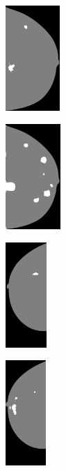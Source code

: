 \documentclass{beamer}
\begin{document}
\begin{frame}
		\begin{figure}[h]
		\centering
			\begin{subfigure}{0.24\textwidth}
				\centering
					\includegraphics[height=4cm]{plots/label_ex1.png}
			\end{subfigure}
			\begin{subfigure}{0.24\textwidth}
				\centering
					\includegraphics[height=4cm]{plots/segmentation_ex1_v3_zeropointone.png}
			\end{subfigure}
			\begin{subfigure}{0.24\textwidth}
				\centering
					\includegraphics[height=4cm]{plots/label_ex2.png}
			\end{subfigure}
			\begin{subfigure}{0.24\textwidth}
				\centering
					\includegraphics[height=4cm]{plots/segmentation_ex2_v3_zeropointone.png}
			\end{subfigure}
		\end{figure}
		
		
	\end{frame}
\end{document}
